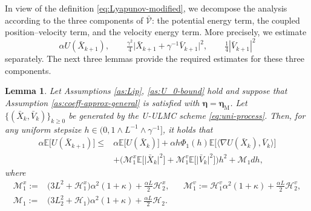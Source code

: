 \documentclass[12pt]{article}
\numberwithin{equation}{section}
\renewcommand{\H}{\mathcal{H}}
\newcommand{\M}{\mathcal{M}}
\newtheorem{lem}{Lemma}[section]
\begin{document}




In view of the definition \eqref{eq:Lyapunov-modified}, we decompose the analysis according to the three components of $\bar{\mathcal V}$: the potential energy term, the coupled position--velocity term, and the velocity energy term. 
%
More precisely, we estimate
\[
\alpha U(\bar X_{k+1}),
\qquad
\tfrac{\gamma^2}{4}
\big|
\bar X_{k+1}+\gamma^{-1}\bar V_{k+1}
\big|^2,
\qquad
\tfrac14|\bar V_{k+1}|^2
\]
separately. 
%
The next three lemmas provide the required estimates for these three components. 





\begin{lem}
\label{lem:potential-one-step}
Let Assumptions \ref{as:Lip}, \ref{as:U_0-bound}  hold and suppose that Assumption \ref{as:coeff-approx-general} is satisfied with $\boldsymbol{\eta}=\boldsymbol{\eta}_{\mathrm M}$. Let $\{(\bar{X}_k,\bar{V}_k)\}_{k\geq0}$ be generated by the U-ULMC scheme \eqref{eq:uni-process}. Then, for any uniform stepsize $h\in(0,1\wedge L^{-1}\wedge \gamma^{-1}]$, it holds that
\begin{equation}\label{eq:potential-one-step}
\begin{aligned}
\alpha \mathbb{E}
\Big[
U(\bar{X}_{k+1})
\Big]
\leq   &
\alpha \mathbb{E}
\Big[
U(\bar{X}_k)
\Big]
+
\alpha h\Phi_1(h)
\mathbb{E}
\Big[
\big\langle
\nabla U(\bar{X}_k),
\bar{V}_k
\big\rangle
\Big]
\\     &
+
\Big(
\M^x_1
\mathbb{E}
\Big[
\big|
\bar{X}_k
\big|^2
\Big]
+
\M^v_1
\mathbb{E}
\Big[
\big|
\bar{V}_k
\big|^2
\Big]
\Big)h^2
+
\M_1dh,
\end{aligned}
\end{equation}
where
\begin{equation}
\begin{aligned}
\M^x_1
:=
&
\big(
3L^2+\H^{x}_1
\big)
\alpha^2(1+\kappa)
+
\tfrac{\alpha L}{2}\H^{x}_2,
&& 
\M^v_1
:=
\H^{v}_1
\alpha^2
(1+\kappa)
+
\tfrac{\alpha L}{2}\H^{v}_2,
\\
\M_1
:=  &
\big(
3L_2^2+\H_1
\big)
\alpha^2(1+\kappa)
+
\tfrac{\alpha L}{2}\H_2.
\end{aligned}
\end{equation}
\end{lem}
\end{document}
